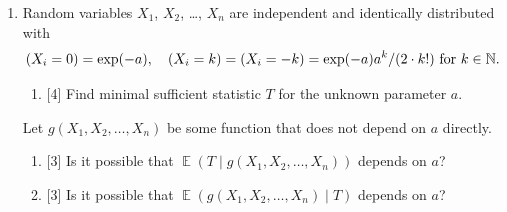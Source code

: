 \documentclass[12pt]{article}
\let\P\relax
\DeclareMathOperator{\P}{\mathbb{P}}
\DeclareMathOperator{\E}{\mathbb{E}}
\newcommand{\NN}{\mathbb{N}}
\begin{document}
\begin{enumerate}
\begin{enumerate}
    \item {[4]} Does maximum likelihood estimator based on $X_1$, \dots, $X_n$ attain the Cramer-Rao boundary?
\end{enumerate}


\item Random variables $X_1$, $X_2$, \dots, $X_n$ are independent and identically distributed with 
\[
\P(X_i = 0) = \exp(-a), \quad \P(X_i = k) = \P(X_i = -k) = \exp(-a)a^k / (2\cdot k!) \text{ for } k\in \NN.
\]
\begin{enumerate}
    \item {[4]} Find minimal sufficient statistic $T$ for the unknown parameter $a$.
\end{enumerate}
Let $g(X_1, X_2, \dots, X_n)$ be some function that does not depend on $a$ directly. 
\begin{enumerate}[resume]
    \item {[3]} Is it possible that $\E(T \mid g(X_1, X_2, \dots, X_n))$ depends on $a$?
    \item {[3]} Is it possible that $\E(g(X_1, X_2, \dots, X_n) \mid T)$ depends on $a$?
\end{enumerate}

\end{enumerate}
\end{document}
